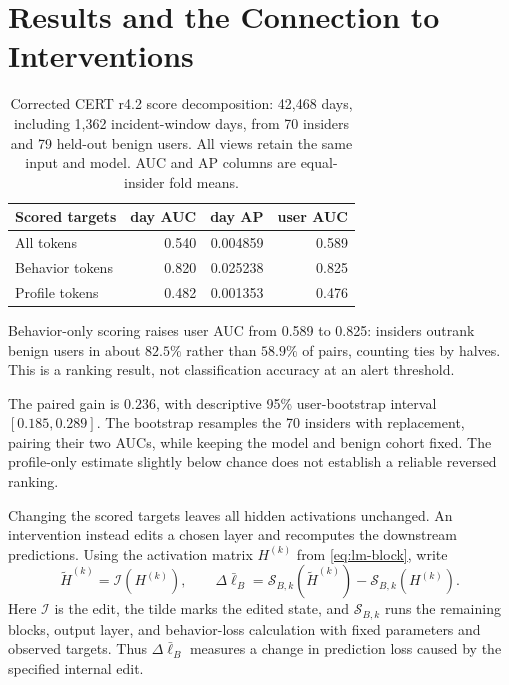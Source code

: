 \documentclass[12pt]{report}
\begin{document}
\section{Results and the Connection to Interventions}
\label{sec:lm-finding}
\begin{table}[!htbp]
\centering
\caption[Corrected language-model score decomposition]{Corrected CERT r4.2
score decomposition: 42,468 days, including 1,362 incident-window days, from
70 insiders and 79 held-out benign users. All views retain the same input
and model. AUC and AP columns are equal-insider fold means.}
\label{tab:lm-views}
\begin{tabular}{lrrr}
\toprule
Scored targets & day AUC & day AP & user AUC \\
\midrule
All tokens & 0.540 & 0.004859 & 0.589 \\
Behavior tokens & 0.820 & 0.025238 & 0.825 \\
Profile tokens & 0.482 & 0.001353 & 0.476 \\
\bottomrule
\end{tabular}
\end{table}
Behavior-only scoring raises user AUC from 0.589 to 0.825: insiders
outrank benign users in about $82.5\%$ rather than $58.9\%$ of
pairs, counting ties by halves. This is a ranking result, not
classification accuracy at an alert threshold.

The paired gain is $0.236$, with descriptive 95\% user-bootstrap
interval $[0.185,0.289]$. The bootstrap resamples the 70 insiders
with replacement, pairing their two AUCs, while keeping the model
and benign cohort fixed. The profile-only estimate slightly below
chance does not establish a reliable reversed ranking.

Changing the scored targets leaves all hidden activations unchanged.
An intervention instead edits a chosen layer and recomputes the
downstream predictions. Using the activation matrix $H^{(k)}$
from \eqref{eq:lm-block}, write
\begin{equation}
\widetilde H^{(k)}=\mathcal I(H^{(k)}),\qquad
\Delta\bar\ell_B=
\mathcal S_{B,k}(\widetilde H^{(k)})-\mathcal S_{B,k}(H^{(k)}).
\label{eq:lm-intervention-bridge}
\end{equation}
Here $\mathcal I$ is the edit, the tilde marks the edited state,
and $\mathcal S_{B,k}$ runs the remaining blocks, output layer,
and behavior-loss calculation with fixed parameters and observed
targets. Thus $\Delta\bar\ell_B$ measures a change in prediction
loss caused by the specified internal edit.
\end{document}
